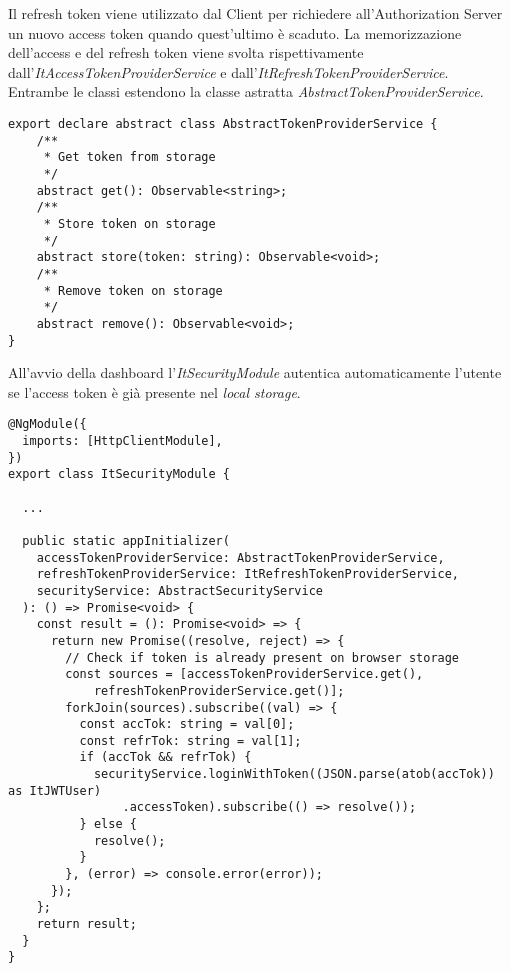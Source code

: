 \FloatBarrier 
Il refresh token viene utilizzato dal Client per richiedere all'Authorization Server un nuovo access token quando quest'ultimo è scaduto.
La memorizzazione dell'access e del refresh token viene svolta rispettivamente dall'\textit{ItAccessTokenProviderService} e dall'\textit{ItRefreshTokenProviderService}.
Entrambe le classi estendono la classe astratta \textit{AbstractTokenProviderService}.\\
\begin{lstlisting}[caption={Classe astratta AbstractTokenProviderService}, style=javaScriptCode]
export declare abstract class AbstractTokenProviderService {
    /**
     * Get token from storage
     */
    abstract get(): Observable<string>;
    /**
     * Store token on storage
     */
    abstract store(token: string): Observable<void>;
    /**
     * Remove token on storage
     */
    abstract remove(): Observable<void>;
}
\end{lstlisting}
All'avvio della dashboard l'\textit{ItSecurityModule} autentica automaticamente l'utente se l'access token è già presente nel \textit{local storage}.\newline
\begin{lstlisting}[caption={Login con token nell'ItSecurityModule}, style=javaScriptCode]
@NgModule({
  imports: [HttpClientModule],
})
export class ItSecurityModule {
    
  ...

  public static appInitializer(
    accessTokenProviderService: AbstractTokenProviderService,
    refreshTokenProviderService: ItRefreshTokenProviderService,
    securityService: AbstractSecurityService
  ): () => Promise<void> {
    const result = (): Promise<void> => {
      return new Promise((resolve, reject) => {
        // Check if token is already present on browser storage
        const sources = [accessTokenProviderService.get(), 
            refreshTokenProviderService.get()];
        forkJoin(sources).subscribe((val) => {
          const accTok: string = val[0];
          const refrTok: string = val[1];
          if (accTok && refrTok) {
            securityService.loginWithToken((JSON.parse(atob(accTok)) as ItJWTUser)
                .accessToken).subscribe(() => resolve());
          } else {
            resolve();
          }
        }, (error) => console.error(error));
      });
    };
    return result;
  }
}
\end{lstlisting}

